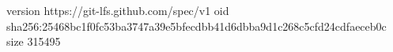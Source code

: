 version https://git-lfs.github.com/spec/v1
oid sha256:25468bc1f0fc53ba3747a39e5bfecdbb41d6dbba9d1c268c5cfd24cdfaeceb0c
size 315495
